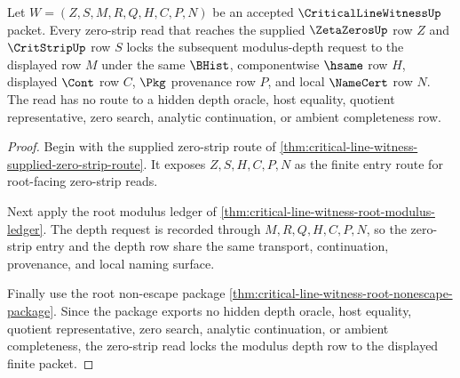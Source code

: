 \begin{theorem}
\label{thm:critical-line-witness-zero-strip-depth-lock}
Let $W=(Z,S,M,R,Q,H,C,P,N)$ be an accepted $\CriticalLineWitnessUp$ packet. Every zero-strip read that reaches the supplied $\ZetaZerosUp$ row $Z$ and $\CritStripUp$ row $S$ locks the subsequent modulus-depth request to the displayed row $M$ under the same $\BHist$, componentwise $\hsame$ row $H$, displayed $\Cont$ row $C$, $\Pkg$ provenance row $P$, and local $\NameCert$ row $N$. The read has no route to a hidden depth oracle, host equality, quotient representative, zero search, analytic continuation, or ambient completeness row.
\end{theorem}
\begin{proof}
Begin with the supplied zero-strip route of \autoref{thm:critical-line-witness-supplied-zero-strip-route}. It exposes $Z,S,H,C,P,N$ as the finite entry route for root-facing zero-strip reads.

Next apply the root modulus ledger of \autoref{thm:critical-line-witness-root-modulus-ledger}. The depth request is recorded through $M,R,Q,H,C,P,N$, so the zero-strip entry and the depth row share the same transport, continuation, provenance, and local naming surface.

Finally use the root non-escape package \autoref{thm:critical-line-witness-root-nonescape-package}. Since the package exports no hidden depth oracle, host equality, quotient representative, zero search, analytic continuation, or ambient completeness, the zero-strip read locks the modulus depth row to the displayed finite packet.
\end{proof}

